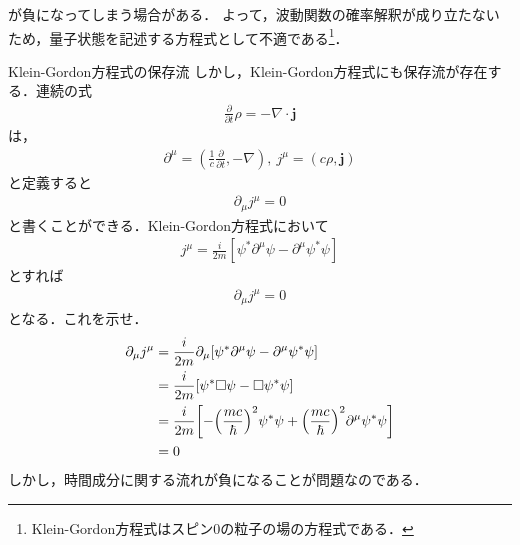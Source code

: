 \documentclass{report}
\begin{document}
が負になってしまう場合がある．
よって，波動関数の確率解釈が成り立たないため，量子状態を記述する方程式として不適である\footnote{Klein-Gordon方程式はスピン0の粒子の場の方程式である．}．
\begin{myexc}{Klein-Gordon方程式の保存流}{}
しかし，Klein-Gordon方程式にも保存流が存在する．連続の式
\begin{align}
  \frac{\partial}{\partial t}\rho = -\nabla \cdot \bm{j}
\end{align}
は，
\begin{align}
  \partial^{\mu} = (\frac{1}{c}\frac{\partial}{\partial t}, -\nabla),\ j^\mu = (c\rho, \bm{j})
\end{align}
と定義すると
\begin{align}
  \partial_\mu j^\mu = 0
\end{align}
と書くことができる．Klein-Gordon方程式において
\begin{align}
  j^\mu = \frac{i}{2m}[\psi^{*}\partial^\mu\psi - \partial^\mu \psi^{*}\psi]
\end{align}
とすれば
\begin{align}
  \partial_\mu j^\mu = 0
\end{align}
となる．これを示せ．
\tcblower
\begin{align}
  \partial_\mu j^\mu &= \frac{i}{2m}\partial_\mu[\psi^{*}\partial^\mu\psi - \partial^\mu \psi^{*}\psi]\\
  &= \frac{i}{2m}[\psi^{*}\Box\psi - \Box \psi^{*}\psi]\\
  &= \frac{i}{2m}\qty[-\qty(\frac{mc}{\hbar})^2\psi^{*}\psi + \qty(\frac{mc}{\hbar})^2 \partial^\mu \psi^{*}\psi]\\
  &= 0
\end{align}
しかし，時間成分に関する流れが負になることが問題なのである．
\end{myexc}
\end{document}
